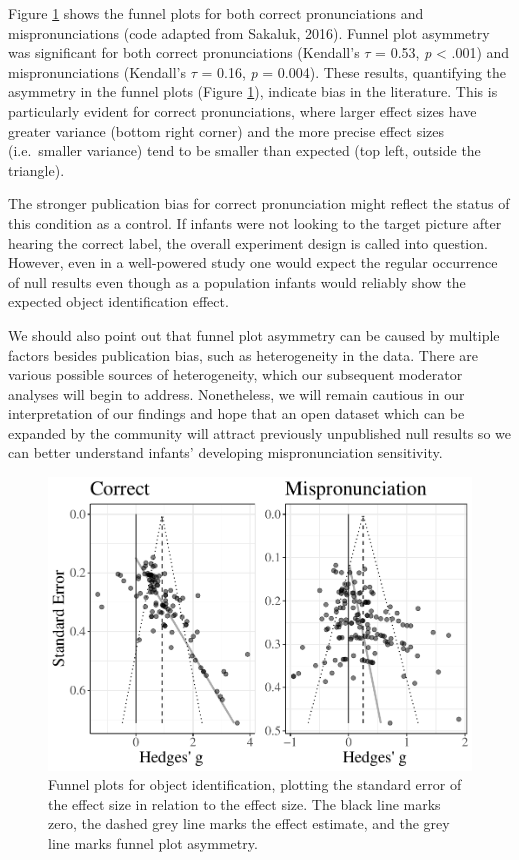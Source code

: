 \documentclass[man]{apa6}
\begin{document}
Figure \ref{fig:FunnelCombo} shows the funnel plots for both correct pronunciations and mispronunciations (code adapted from Sakaluk, 2016). Funnel plot asymmetry was significant for both correct pronunciations (Kendall's \(\tau\) = 0.53, \emph{p} \textless{} .001) and mispronunciations (Kendall's \(\tau\) = 0.16, \emph{p} = 0.004). These results, quantifying the asymmetry in the funnel plots (Figure \ref{fig:FunnelCombo}), indicate bias in the literature. This is particularly evident for correct pronunciations, where larger effect sizes have greater variance (bottom right corner) and the more precise effect sizes (i.e.~smaller variance) tend to be smaller than expected (top left, outside the triangle).

The stronger publication bias for correct pronunciation might reflect the status of this condition as a control. If infants were not looking to the target picture after hearing the correct label, the overall experiment design is called into question. However, even in a well-powered study one would expect the regular occurrence of null results even though as a population infants would reliably show the expected object identification effect.

We should also point out that funnel plot asymmetry can be caused by multiple factors besides publication bias, such as heterogeneity in the data. There are various possible sources of heterogeneity, which our subsequent moderator analyses will begin to address. Nonetheless, we will remain cautious in our interpretation of our findings and hope that an open dataset which can be expanded by the community will attract previously unpublished null results so we can better understand infants' developing mispronunciation sensitivity.

\begin{figure}
\centering
\includegraphics{VonHolzenBergmann_MPMetaAnalysis_files/figure-latex/FunnelCombo-1.pdf}
\caption{\label{fig:FunnelCombo}Funnel plots for object identification, plotting the standard error of the effect size in relation to the effect size. The black line marks zero, the dashed grey line marks the effect estimate, and the grey line marks funnel plot asymmetry.}
\end{figure}
\end{document}
